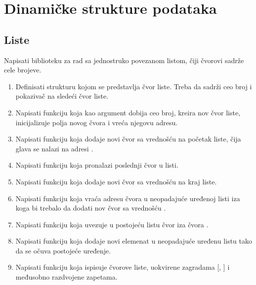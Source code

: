 
\chapter{Dinamičke strukture podataka}

\section{Liste}

\begin{Exercise}[label=601]
Napisati biblioteku za rad sa jednostruko povezanom listom, čiji čvorovi sadrže cele brojeve. 
\begin{enumerate}
\item Definisati strukturu  kojom se predstavlja čvor liste. Treba da sadrži ceo broj  i pokazivač na sledeći čvor liste.
\item Napisati funkciju  koja kao argument dobija ceo broj, kreira nov čvor liste, inicijalizuje polja novog čvora i vreća njegovu adresu.
 \item Napisati funkciju  koja dodaje novi čvor sa vrednošću  na početak liste, čija glava se nalazi na adresi .
 \item Napisati funkciju  koja pronalazi poslednji čvor u listi.
 \item Napisati funkciju  koja dodaje novi čvor sa vrednošću  na kraj liste. 
 \item Napisati funkciju  koja vraća adresu čvora u neopadajuće uređenoj listi iza koga bi trebalo da dodati nov čvor sa vrednošću .
 \item Napisati funkciju  koja uvezuje u postojeću listu čvor  iza čvora .
 \item Napisati funkciju  koja dodaje novi elemenat u neopadajuće uređenu listu tako da se očuva postojeće uređenje.
 \item Napisati funkciju  koja ispisuje čvorove liste, uokvirene zagradama [, ] i međusobno razdvojene zapetama.

\end{enumerate}
\end{Exercise}
